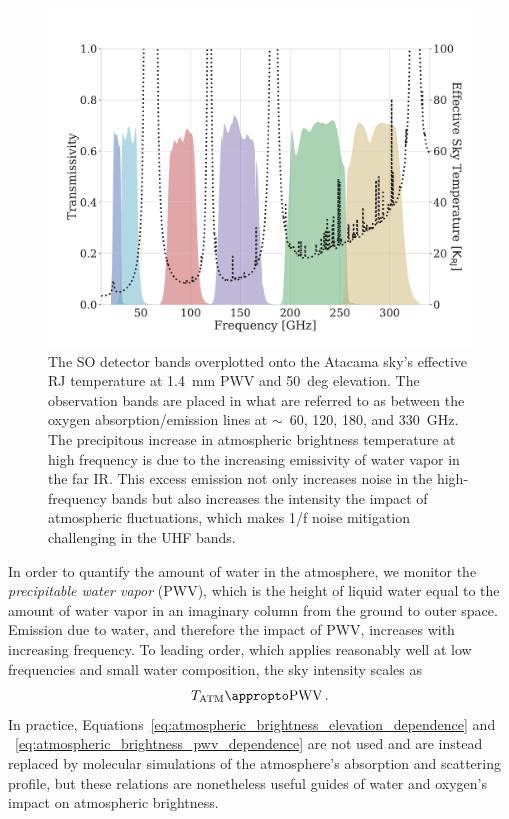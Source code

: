 \begin{figure}[!t]
    \centering
    \includegraphics[width=0.8\linewidth, trim=0cm 1cm 0cm 2cm, clip]{InstrumentOverview/Figures/so_bands.pdf}
    \caption{The SO detector bands overplotted onto the Atacama sky's effective RJ temperature at 1.4~mm PWV and 50~deg elevation. The observation bands are placed in what are referred to as  between the oxygen absorption/emission lines at $\sim$~60, 120, 180, and 330~GHz. The precipitous increase in atmospheric brightness temperature at high frequency is due to the increasing emissivity of water vapor in the far IR. This excess emission not only increases noise in the high-frequency bands but also increases the intensity the impact of atmospheric fluctuations, which makes 1/f noise mitigation challenging in the UHF bands.}
    \label{fig:so_bands_atacama}
\end{figure}

In order to quantify the amount of water in the atmosphere, we monitor the \textit{precipitable water vapor} (PWV), which is the height of liquid water equal to the amount of water vapor in an imaginary column from the ground to outer space. Emission due to water, and therefore the impact of PWV, increases with increasing frequency. To leading order, which applies reasonably well at low frequencies and small water composition, the sky intensity scales as
\begin{equation}
    T_{\mathrm{ATM}} \appropto \mathrm{PWV} \, .
    \label{eq:atmospheric_brightness_pwv_dependence}
\end{equation}
In practice, Equations~\ref{eq:atmospheric_brightness_elevation_dependence} and ~\ref{eq:atmospheric_brightness_pwv_dependence} are not used and are instead replaced by molecular simulations of the atmosphere's absorption and scattering profile, but these relations are nonetheless useful guides of water and oxygen's impact on atmospheric brightness. 

